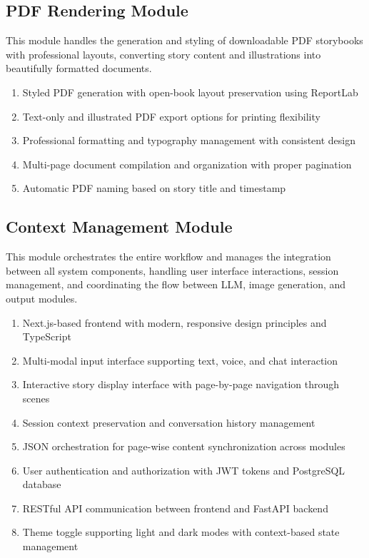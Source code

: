 \subsection{PDF Rendering Module}

This module handles the generation and styling of downloadable PDF storybooks with professional layouts, converting story content and illustrations into beautifully formatted documents.

\begin{enumerate}
    \item Styled PDF generation with open-book layout preservation using ReportLab
    \item Text-only and illustrated PDF export options for printing flexibility
    \item Professional formatting and typography management with consistent design
    \item Multi-page document compilation and organization with proper pagination
    \item Automatic PDF naming based on story title and timestamp
\end{enumerate}

\subsection{Context Management Module}

This module orchestrates the entire workflow and manages the integration between all system components, handling user interface interactions, session management, and coordinating the flow between LLM, image generation, and output modules.

\begin{enumerate}
    \item Next.js-based frontend with modern, responsive design principles and TypeScript
    \item Multi-modal input interface supporting text, voice, and chat interaction
    \item Interactive story display interface with page-by-page navigation through scenes
    \item Session context preservation and conversation history management
    \item JSON orchestration for page-wise content synchronization across modules
    \item User authentication and authorization with JWT tokens and PostgreSQL database
    \item RESTful API communication between frontend and FastAPI backend
    \item Theme toggle supporting light and dark modes with context-based state management
\end{enumerate}

